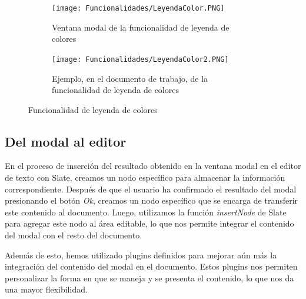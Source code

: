 \begin{figure}[ht!]
  \centering
  \begin{subfigure}{\textwidth}
    \centering
    \texttt{[image: Funcionalidades/LeyendaColor.PNG]}
    \caption{Ventana modal de la funcionalidad de leyenda de colores}
    \label{fig:leyendacolor01}
  \end{subfigure}

  \begin{subfigure}{\textwidth}
    \centering
    \texttt{[image: Funcionalidades/LeyendaColor2.PNG]}
    \caption{Ejemplo, en el documento de trabajo, de la funcionalidad de leyenda de colores}
    \label{fig:leyendacolor02}
  \end{subfigure}

  \caption{Funcionalidad de leyenda de colores}
  \label{fig:leyendacolor}
\end{figure}


\subsection{Del modal al editor}
En el proceso de inserción del resultado obtenido en la ventana modal en el editor de texto con Slate, creamos un nodo específico para almacenar la información correspondiente. Después de que el usuario ha confirmado el resultado del modal presionando el botón \textit{Ok}, creamos un nodo específico que se encarga de transferir este contenido al documento. Luego, utilizamos la función \textit{insertNode} de Slate para agregar este nodo al área editable, lo que nos permite integrar el contenido del modal con el resto del documento.

Además de esto, hemos utilizado plugins definidos para mejorar aún más la integración del contenido del modal en el documento. Estos plugins nos permiten personalizar la forma en que se maneja y se presenta el contenido, lo que nos da una mayor flexibilidad.

